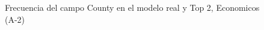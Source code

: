 \begin{figure}[H]
    \centering
    
    \caption{Frecuencia del campo County en el modelo real y Top 2, Economicos (A-2)}
    \label{frecuency-County-top2}
\end{figure}